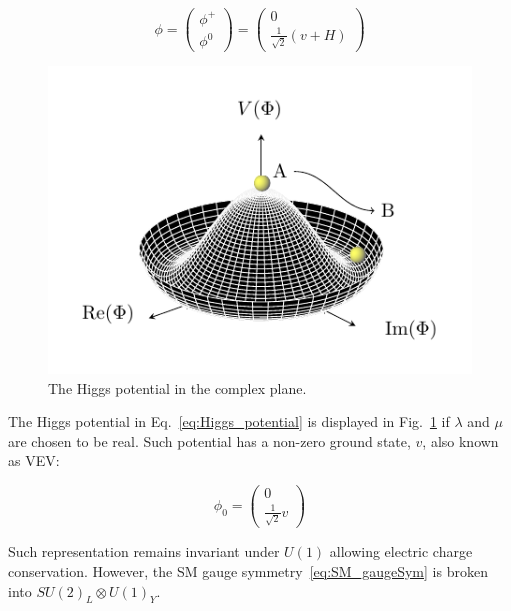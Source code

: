 			\begin{equation}
			\label{eq:Higgs_doublet}
				\phi = 
				\begin{pmatrix}
					\phi^+ \\ \phi^0
				\end{pmatrix} 
				=
				\begin{pmatrix}
					0 \\ \frac{1}{\sqrt{2}} \left ( v + H \right )
				\end{pmatrix}
			\end{equation}

			\begin{figure}[!htb]
				\centering
				\includegraphics[width=.5\textwidth]{HiggsPotential/HiggsPotential}
			\caption{\label{fig:higgs_potential}The Higgs potential in the complex plane.} %
			\end{figure}

			The Higgs potential in Eq.~\ref{eq:Higgs_potential} is displayed in Fig.~\ref{fig:higgs_potential} if $\lambda$ and $\mu$ are chosen to be real. Such potential has a non-zero ground state, $v$, also known as \ac{VEV}:

			\begin{equation}
			\label{eq:Higgs_vev}
				\phi_0 = 
				\begin{pmatrix}
					0 \\ \frac{1}{\sqrt{2}} v
				\end{pmatrix}
			\end{equation}

			\noindent Such representation remains invariant under $U(1)$ allowing electric charge conservation. However, the \ac{SM} gauge symmetry~\ref{eq:SM_gaugeSym} is broken into $SU(2)_L \otimes U(1)_Y$.

